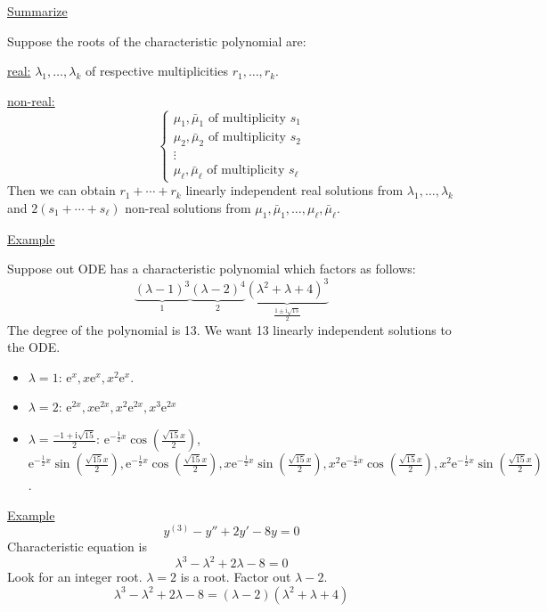 \documentclass{article}
\newcommand{\mathe}{\mathrm{e}}
\newcommand{\mathi}{\mathrm{i}}
\begin{document}
\begin{tmornamented}
  {\underline{Summarize}}
  
  Suppose the roots of the characteristic polynomial are:
  
  {\underline{real:}} $\lambda_1, \ldots, \lambda_k$ of respective
  multiplicities $r_1, \ldots, r_k$.
  
  {\underline{non-real:}}
  \[ \left\{\begin{array}{l}
       \mu_1, \bar{\mu}_1  \text{ of multiplicity } s_1\\
       \mu_2, \bar{\mu}_2  \text{ of multiplicity } s_2\\
       \vdots\\
       \mu_{\ell}, \bar{\mu}_{\ell}  \text{ of multiplicity } s_{\ell}
     \end{array}\right. \]
  Then we can obtain $r_1 + \cdots + r_k$ linearly independent real solutions
  from $\lambda_1, \ldots, \lambda_k$ and $2 (s_1 + \cdots + s_{\ell})$
  non-real solutions from $\mu_1, \bar{\mu}_1, \ldots, \mu_{\ell},
  \bar{\mu}_{\ell}$.
\end{tmornamented}

{\underline{Example}}

Suppose out ODE has a characteristic polynomial which factors as follows:
\[ \underbrace{(\lambda - 1)^3}_1  \underbrace{(\lambda - 2)^4}_2
   \underbrace{(\lambda^2 + \lambda + 4)^3}_{\frac{1 \pm \mathi \sqrt{15}}{2}}
\]
The degree of the polynomial is 13. We want 13 linearly independent solutions
to the ODE.
\begin{itemize}
  \item $\lambda = 1$: $\mathe^x, x \mathe^x, x^2 \mathe^x$.
  
  \item $\lambda = 2$: $\mathe^{2 x}, x \mathe^{2 x}, x^2 \mathe^{2 x}, x^3
  \mathe^{2 x}$
  
  \item $\lambda = \frac{- 1 + \mathi \sqrt{15}}{2}$: $\mathe^{- \frac{1}{2}
  x} \cos \left( \frac{\sqrt{15} x}{2} \right)$, $\mathe^{- \frac{1}{2} x}
  \sin \left( \frac{\sqrt{15} x}{2} \right), \mathe^{- \frac{1}{2} x} \cos
  \left( \frac{\sqrt{15} x}{2} \right), x \mathe^{- \frac{1}{2} x} \sin \left(
  \frac{\sqrt{15} x}{2} \right), x^2 \mathe^{- \frac{1}{2} x} \cos \left(
  \frac{\sqrt{15} x}{2} \right), x^2 \mathe^{- \frac{1}{2} x} \sin \left(
  \frac{\sqrt{15} x}{2} \right)$.
\end{itemize}
{\underline{Example}}
\[ y^{(3)} - y'' + 2 y' - 8 y = 0 \]
Characteristic equation is
\[ \lambda^3 - \lambda^2 + 2 \lambda - 8 = 0 \]
Look for an integer root. $\lambda = 2$ is a root. Factor out $\lambda - 2$.
\[ \lambda^3 - \lambda^2 + 2 \lambda - 8 = (\lambda - 2) (\lambda^2 + \lambda
   + 4) \]
\end{document}
